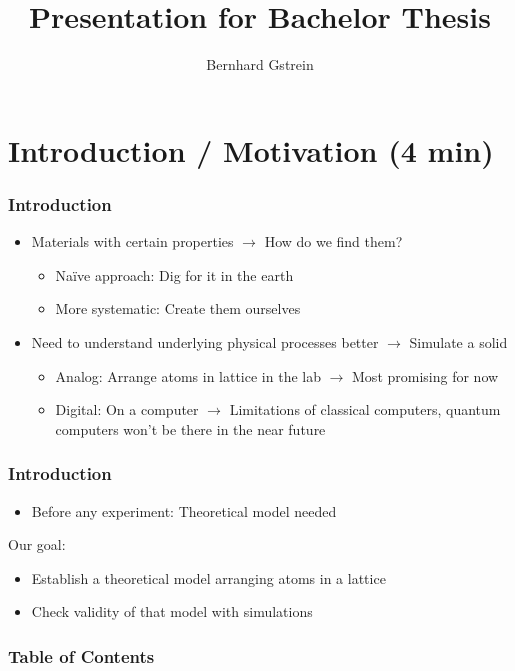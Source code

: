\documentclass[pdflatex,compress]{beamer}
\title{Presentation for Bachelor Thesis}
\author{Bernhard Gstrein}
\begin{document}
\maketitle

\AtBeginSection[]{}
\section{Introduction / Motivation (4 min)}

\begin{frame}
\frametitle{Introduction}
\begin{itemize}
	\item Materials with certain properties $\rightarrow$ How do we find them?
		\begin{itemize}
			\item Na{\"i}ve approach: Dig for it in the earth
			\item More systematic: Create them ourselves
		\end{itemize}
	\item Need to understand underlying physical processes better $\rightarrow$ Simulate a solid
		\begin{itemize}
		\item Analog: Arrange atoms in lattice in the lab $\rightarrow$ Most promising for now
		\item Digital: On a computer $\rightarrow$ Limitations of classical computers, quantum computers won't be there in the near future
		\end{itemize}
\end{itemize}
\end{frame}

\begin{frame}
\frametitle{Introduction}
\begin{itemize}
	\item Before any experiment: Theoretical model needed
\end{itemize}
Our goal:
\begin{itemize}
	\item Establish a theoretical model arranging atoms in a lattice
	\item Check validity of that model with simulations
\end{itemize}
\end{frame}

\begin{frame}
\frametitle{Table of Contents}
\tableofcontents
\end{frame}
\end{document}
